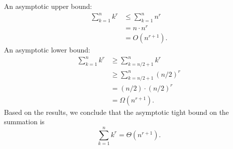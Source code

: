 An asymptotic upper bound:
\begin{align*}
    \sum_{k=1}^nk^r &\le \sum_{k=1}^nn^r \\
    &= n\cdot n^r \\
    &= O(n^{r+1}).
\end{align*}
An asymptotic lower bound:
\begin{align*}
    \sum_{k=1}^nk^r &\ge \sum_{k=n/2+1}^nk^r \\
    &\ge \sum_{k=n/2+1}^n(n/2)^r \\
    &= (n/2)\cdot(n/2)^r \\
    &= \Omega(n^{r+1}).
\end{align*}
Based on the results, we conclude that the asymptotic tight bound on the summation is
\[
    \sum_{k=1}^nk^r = \Theta(n^{r+1}).
\]
